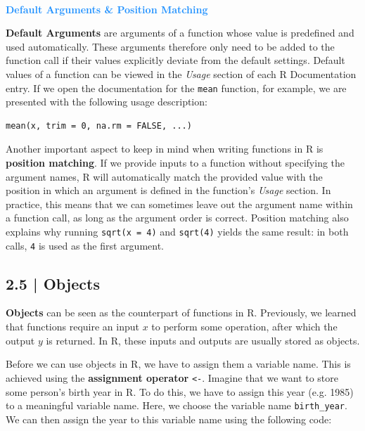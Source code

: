 \begin{box-info} \\


\textcolor{dodgerblue}{\textbf{Default Arguments \& Position Matching}}

\vspace{2mm}

\textbf{Default Arguments} are arguments of a function whose value is predefined and used automatically. These arguments therefore only need to be added to the function call if their values explicitly deviate from the default settings. Default values of a function can be viewed in the \emph{Usage} section of each R Documentation entry. If we open the documentation for the \texttt{mean} function, for example, we are presented with the following usage description:

\begin{lstlisting}
mean(x, trim = 0, na.rm = FALSE, ...)
\end{lstlisting}

Another important aspect to keep in mind when writing functions in \textsf{R} is \textbf{position matching}. If we provide inputs to a function without specifying the argument names, \textsf{R} will automatically match the provided value with the position in which an argument is defined in the function's \emph{Usage} section. In practice, this means that we can sometimes leave out the argument name within a function call, as long as the argument order is correct. Position matching also explains why running \texttt{sqrt(x = 4)} and \texttt{sqrt(4)} yields the same result: in both calls, \texttt{4} is used as the first argument. 
\end{box-info}

\subsection{{\normalfont\textsf{\textcolor{sBlue}{\small 2.5 |}}} Objects}

\textbf{Objects} can be seen as the counterpart of functions in \textsf{R}. Previously, we learned that functions require an input $x$ to perform some operation, after which the output $y$ is returned. In \textsf{R}, these inputs and outputs are usually stored as objects.

Before we can use objects in \textsf{R}, we have to assign them a variable name. This is achieved using the \textbf{assignment operator} \texttt{<-}. Imagine that we want to store some person's birth year in \textsf{R}. To do this, we have to assign this year (e.g. 1985) to a meaningful variable name. Here, we choose the variable name \texttt{birth\_year}. We can then assign the year to this variable name using the following code:

